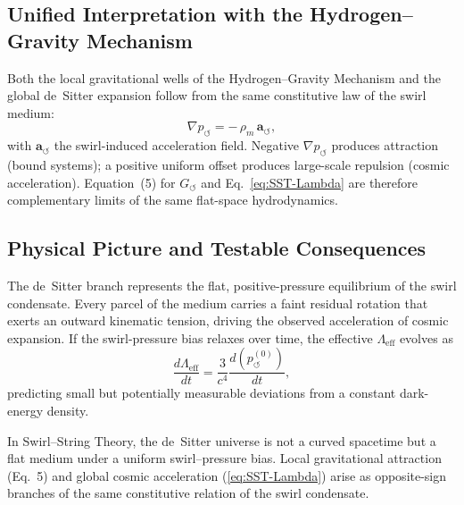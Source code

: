\documentclass[10pt,reprint,aps,onecolumn,nofootinbib]{revtex4-2}
\begin{document}
        \subsection{Unified Interpretation with the Hydrogen--Gravity Mechanism}

            Both the local gravitational wells of the Hydrogen--Gravity Mechanism and the global de~Sitter expansion follow from the same constitutive law of the swirl medium:
            \[
                \nabla p_{\!\circlearrowleft} = -\,\rho_{\!m}\, \mathbf{a}_{\!\circlearrowleft},
            \]
            with $\mathbf{a}_{\!\circlearrowleft}$ the swirl-induced acceleration field.
            Negative $\nabla p_{\!\circlearrowleft}$ produces attraction (bound systems);
            a positive uniform offset produces large-scale repulsion (cosmic acceleration).
            Equation~(5) for $G_{\!\circlearrowleft}$ and Eq.~\eqref{eq:SST-Lambda} are therefore complementary limits of the same flat-space hydrodynamics.

        \subsection{Physical Picture and Testable Consequences}

            The de~Sitter branch represents the flat, positive-pressure equilibrium of the swirl condensate.
            Every parcel of the medium carries a faint residual rotation that exerts an outward kinematic tension, driving the observed acceleration of cosmic expansion.
            If the swirl-pressure bias relaxes over time, the effective $\Lambda_{\text{eff}}$ evolves as
            \begin{equation}
            \frac{d\Lambda_{\text{eff}}}{dt}
            = \frac{3}{c^{4}}\frac{d(p_{\!\circlearrowleft}^{(0)})}{dt},
            \end{equation}
            predicting small but potentially measurable deviations from a constant dark-energy density.

            \begin{tcolorbox}[colframe=gray, title={Summary}]
            In Swirl--String Theory, the de~Sitter universe is not a curved spacetime but a flat medium under a uniform swirl--pressure bias.
            Local gravitational attraction (Eq.~5) and global cosmic acceleration (\ref{eq:SST-Lambda}) arise as opposite-sign branches of the same constitutive relation of the swirl condensate.
            \end{tcolorbox}
\end{document}
